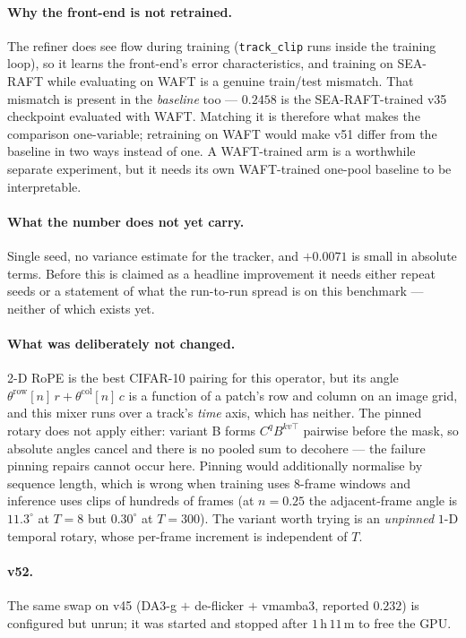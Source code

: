 \documentclass[11pt,a4paper]{article}
\begin{document}
\paragraph{Why the front-end is not retrained.} The refiner does see flow during training
(\texttt{track\_clip} runs inside the training loop), so it learns the front-end's error
characteristics, and training on SEA-RAFT while evaluating on WAFT is a genuine train/test
mismatch. That mismatch is present in the \emph{baseline} too --- $0.2458$ is the SEA-RAFT-trained
v35 checkpoint evaluated with WAFT. Matching it is therefore what makes the comparison
one-variable; retraining on WAFT would make v51 differ from the baseline in two ways instead of
one. A WAFT-trained arm is a worthwhile separate experiment, but it needs its own WAFT-trained
one-pool baseline to be interpretable.

\paragraph{What the number does not yet carry.} Single seed, no variance estimate for the tracker,
and $+0.0071$ is small in absolute terms. Before this is claimed as a headline improvement it
needs either repeat seeds or a statement of what the run-to-run spread is on this benchmark ---
neither of which exists yet.

\paragraph{What was deliberately not changed.} 2-D RoPE is the best CIFAR-10 pairing for this
operator, but its angle $\theta^{\mathrm{row}}[n]\,r+\theta^{\mathrm{col}}[n]\,c$ is a function of
a patch's row and column on an image grid, and this mixer runs over a track's \emph{time} axis,
which has neither. The pinned rotary does not apply either: variant B forms $C^{q}B^{kv\top}$
pairwise before the mask, so absolute angles cancel and there is no pooled sum to decohere --- the
failure pinning repairs cannot occur here. Pinning would additionally normalise by sequence
length, which is wrong when training uses $8$-frame windows and inference uses clips of hundreds
of frames (at $n{=}0.25$ the adjacent-frame angle is $11.3^{\circ}$ at $T{=}8$ but $0.30^{\circ}$
at $T{=}300$). The variant worth trying is an \emph{unpinned} $1$-D temporal rotary, whose
per-frame increment is independent of $T$.

\paragraph{v52.} The same swap on v45 (DA3-g $+$ de-flicker $+$ vmamba3, reported $0.232$) is
configured but unrun; it was started and stopped after $1$\,h\,$11$\,m to free the GPU.
\end{document}
